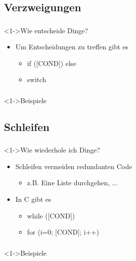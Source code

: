\subsection{Verzweigungen}
\begin{frame}
	\frametitle{\currentsection}
	\framesubtitle{\currentsubsection}
	\begin{block}<1->{Wie entscheide Dinge?}
		\begin{itemize}
			\item Um Entscheidungen zu treffen gibt es
			\begin{itemize}
				\item if ([COND]) else
				\item switch
			\end{itemize}
		\end{itemize}
	\end{block}
\end{frame}
\begin{frame}
	\frametitle{\currentsection}
	\framesubtitle{\currentsubsection}
	\begin{block}<1->{Beispiele}
		
	\end{block}
\end{frame}


\subsection{Schleifen}
\begin{frame}
	\frametitle{\currentsection}
	\framesubtitle{\currentsubsection}
	\begin{block}<1->{Wie wiederhole ich Dinge?}
		\begin{itemize}
			\item Schleifen vermeiden redundanten Code
			\begin{itemize}
				\item z.B. Eine Liste durchgehen, ...
			\end{itemize}
			\item In C gibt es
			\begin{itemize}
				\item while ([COND])
				\item for (i=0; [COND]; i++)
			\end{itemize}
		\end{itemize}
	\end{block}
\end{frame}
\begin{frame}
	\frametitle{\currentsection}
	\framesubtitle{\currentsubsection}
	\begin{block}<1->{Beispiele}
		
	\end{block}
\end{frame}


